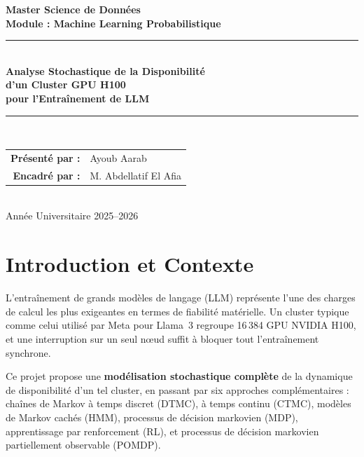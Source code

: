 \documentclass[12pt,a4paper]{article}
\begin{document}
\begin{titlepage}
    \centering
    \large \textbf{Master Science de Données} \\[0.3cm]
    \textbf{Module : Machine Learning Probabilistique} \\[1.2cm]
    \rule{\linewidth}{0.5mm} \\[0.4cm]
    \huge \textbf{Analyse Stochastique de la Disponibilité\\[0.2cm]
    d'un Cluster GPU H100\\[0.2cm]
    pour l'Entraînement de LLM} \\[0.4cm]
    \rule{\linewidth}{0.5mm} \\[1.5cm]
    \large
    \begin{tabular}{rl}
      \textbf{Présenté par :} & Ayoub Aarab \\[0.4cm]
      \textbf{Encadré par :}  & M. Abdellatif El Afia \\
    \end{tabular}\\[1.5cm]
    \vfill
    \large Année Universitaire 2025--2026
\end{titlepage}

\tableofcontents
\newpage

\section{Introduction et Contexte}

L'entraînement de grands modèles de langage (LLM) représente l'une des charges de calcul
les plus exigeantes en termes de fiabilité matérielle.
Un cluster typique comme celui utilisé par Meta pour Llama~3 regroupe 16\,384 GPU NVIDIA H100,
et une interruption sur un seul nœud suffit à bloquer tout l'entraînement synchrone.

Ce projet propose une \textbf{modélisation stochastique complète} de la dynamique de disponibilité
d'un tel cluster, en passant par six approches complémentaires :
chaînes de Markov à temps discret (DTMC), à temps continu (CTMC), modèles de Markov cachés (HMM),
processus de décision markovien (MDP), apprentissage par renforcement (RL),
et processus de décision markovien partiellement observable (POMDP).
\end{document}
